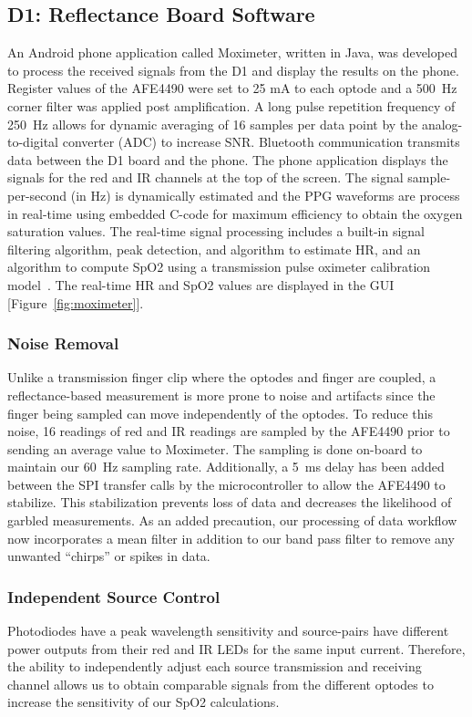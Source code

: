 \subsection{D1: Reflectance Board Software}
An Android phone application called Moximeter, written in Java, was developed to process the received signals from the D1 and display the results on the phone. Register values of the AFE4490 were set to 25 mA to each optode and a 500~Hz corner filter was applied post amplification. A long pulse repetition frequency of 250~Hz allows for dynamic averaging of 16 samples per data point by the analog-to-digital converter (ADC) to increase SNR. Bluetooth communication transmits data between the D1 board and the phone. The phone application displays the signals for the red and IR channels at the top of the screen. The signal sample-per-second (in Hz) is dynamically estimated and the PPG waveforms are process in real-time using embedded C-code for maximum efficiency to obtain the oxygen saturation values. The real-time signal processing includes a built-in signal filtering algorithm, peak detection, and algorithm to estimate HR, and an algorithm to compute SpO2 using a transmission pulse oximeter calibration model~\cite{Bailey2008}. The real-time HR and SpO2 values are displayed in the GUI [Figure~\ref{fig:moximeter}]. 
    
\subsubsection{Noise Removal}
Unlike a transmission finger clip where the optodes and finger are coupled, a reflectance-based measurement is more prone to noise and artifacts since the finger being sampled can move independently of the optodes. To reduce this noise, 16 readings of red and IR readings are sampled by the AFE4490 prior to sending an average value to Moximeter. The sampling is done on-board to maintain our 60~Hz sampling rate. Additionally, a 5~ms delay has been added between the SPI transfer calls by the microcontroller to allow the AFE4490 to stabilize. This stabilization prevents loss of data and decreases the likelihood of garbled measurements. As an added precaution, our processing of data workflow now incorporates a mean filter in addition to our band pass filter to remove any unwanted ``chirps'' or spikes in data. 
        
\subsubsection{Independent Source Control}
Photodiodes have a peak wavelength sensitivity and source-pairs have different power outputs from their red and IR LEDs for the same input current. Therefore, the ability to independently adjust each source transmission and receiving channel allows us to obtain comparable signals from the different optodes to increase the sensitivity of our SpO2 calculations.

